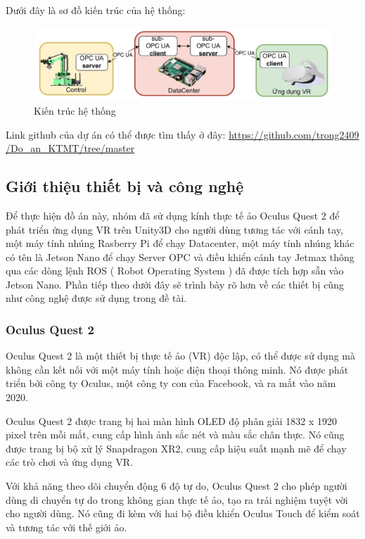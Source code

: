 Dưới đây là sơ đồ kiến trúc của hệ thống:
\begin{figure}[!h]
    \centering
    \includegraphics[width=1\textwidth]{Images/architect_1.jpg}
    \caption{Kiến trúc hệ thống}
    \label{fig:comp_mqtt}
\end{figure}

Link github của dự án có thể được tìm thấy ở đây: \href{https://github.com/trong2409/Do_an_KTMT/tree/master}{https://github.com/trong2409\\/Do\_an\_KTMT/tree/master}

\subsection{Giới thiệu thiết bị và công nghệ}
Để thực hiện đồ án này, nhóm đã sử dụng kính thực tế ảo Oculus Quest 2 để phát triển ứng dụng VR trên Unity3D cho người dùng tương tác với cánh tay, một máy tính nhúng Rasberry Pi để chạy Datacenter, một máy tính nhúng khác có tên là Jetson Nano để chạy Server OPC và điều khiển cánh tay Jetmax thông qua các dòng lệnh ROS ( Robot Operating System ) đã được tích hợp sẵn vào Jetson Nano. Phần tiếp theo dưới đây sẽ trình bày rõ hơn về các thiết bị cũng như công nghệ được sử dụng trong đề tài.
\subsubsection{Oculus Quest 2}
Oculus Quest 2 là một thiết bị thực tế ảo (VR) độc lập, có thể được sử dụng mà không cần kết nối với một máy tính hoặc điện thoại thông minh. Nó được phát triển bởi công ty Oculus, một công ty con của Facebook, và ra mắt vào năm 2020.

Oculus Quest 2 được trang bị hai màn hình OLED độ phân giải 1832 x 1920 pixel trên mỗi mắt, cung cấp hình ảnh sắc nét và màu sắc chân thực. Nó cũng được trang bị bộ xử lý Snapdragon XR2, cung cấp hiệu suất mạnh mẽ để chạy các trò chơi và ứng dụng VR.

Với khả năng theo dõi chuyển động 6 độ tự do, Oculus Quest 2 cho phép người dùng di chuyển tự do trong không gian thực tế ảo, tạo ra trải nghiệm tuyệt vời cho người dùng. Nó cũng đi kèm với hai bộ điều khiển Oculus Touch để kiểm soát và tương tác với thế giới ảo.

